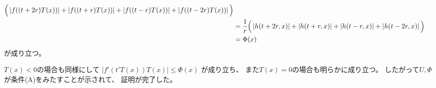 \documentclass[report]{jlreq}
\begin{document}
\begin{answer}
\begin{alignat}{1}
                \Big(
                    \left|{
                        f((t + 2r)T(x))
                    }\right|
                    +
                    \left|{
                        f((t + r)T(x))
                    }\right|
                    +
                    \left|{
                        f((t - r)T(x))
                    }\right|
                    +
                    \left|{
                        f((t - 2r)T(x))
                    }\right|
                \Big)
                \\
            &=
                \frac{1}{r}
                \Big(
                    \left|{
                        h(t + 2r, x)
                    }\right|
                    +
                    \left|{
                        h(t + r, x)
                    }\right|
                    +
                    \left|{
                        h(t - r, x)
                    }\right|
                    +
                    \left|{
                        h(t - 2r, x)
                    }\right|
                \Big)
                \\
            &=
                \Phi(x)
    \end{alignat}
    が成り立つ。

    $T(x) < 0$の場合も同様にして
    $|f'(t'T(x)) T(x)| \le \Phi(x)$
    が成り立ち、
    また$T(x) = 0$の場合も明らかに成り立つ。
    したがって$U, \Phi$が条件(A)をみたすことが示されて、
    証明が完了した。
\end{answer}
\end{document}
